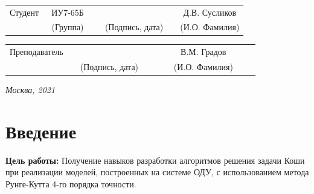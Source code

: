 \documentclass[14pt, a4paper]{extarticle}
\begin{document}
	
	\noindent
	\\
	\\
	
	\noindent
	\\
	
	\vspace{1.5cm}
	\noindent
	\begin{tabular}{l c c c c c}
		Студент      & ~ИУ7-65Б~               & \hspace{2.5cm} & \hspace{2cm}                 & &  Д.В. 
		Сусликов \\\cline{2-2}\cline{4-4} \cline{6-6} 
		\hspace{3cm} & {\footnotesize(Группа)} &                & {\footnotesize(Подпись, дата)} & & {\footnotesize(И.О. Фамилия)}
	\end{tabular}
	
	\noindent
	\begin{tabular}{l c c c c}
		Преподаватель & \hspace{5cm}   & \hspace{2cm}                 & & ~~~~~~В.М. Градов~~~~~~\\\cline{3-3} \cline{5-5} 
		\hspace{3cm}  &                & {\footnotesize(Подпись, дата)} & & {\footnotesize(И.О. Фамилия)}
	\end{tabular}
	
	\vspace{0.6cm}
	\begin{center}	
		\vfill
		\large \textit {Москва, 2021}
	\end{center}
	
	\thispagestyle {empty}
	\pagebreak
	
	\clearpage
		
	\clearpage
	\section*{Введение}
	\textbf{Цель работы:} Получение навыков разработки алгоритмов решения задачи Коши при реализации моделей, построенных на системе ОДУ, с использованием метода Рунге-Кутта 4-го порядка точности.\par
	
\end{document}

